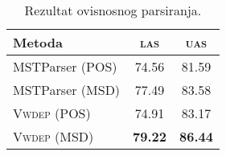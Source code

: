 \begin{table}
\centering
\caption{Rezultat ovisnosnog parsiranja.}
\label{table:depparsing}
\begin{tabular}{|l|c|c|}
\hline
Metoda               & \textsc{las}   & \textsc{uas}    \\ \hline \hline
MSTParser      (POS) & 74.56          & 81.59           \\
MSTParser      (MSD) & 77.49          & 83.58           \\
\textsc{Vwdep} (POS) & 74.91          & 83.17           \\
\textsc{Vwdep} (MSD) & \textbf{79.22} & \textbf{86.44}  \\ \hline
\end{tabular}
\end{table}

